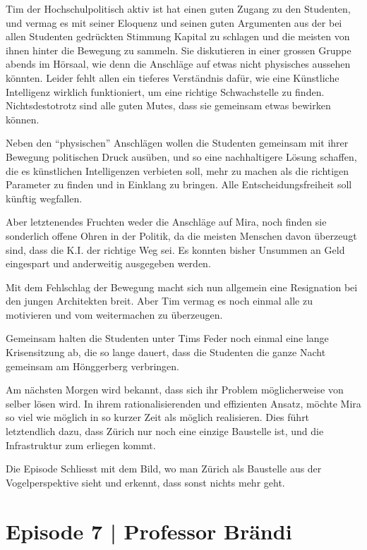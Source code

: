 \documentclass[11pt,a4paper,ngerman]{scrreprt}
\begin{document}
Tim der Hochschulpolitisch aktiv ist hat einen guten Zugang zu den Studenten,
und vermag es mit seiner Eloquenz und seinen guten Argumenten aus der bei allen
Studenten gedrückten Stimmung Kapital zu schlagen und die meisten von ihnen
hinter die Bewegung zu sammeln. Sie diskutieren in einer grossen Gruppe abends
im Hörsaal, wie denn die Anschläge auf etwas nicht physisches aussehen
könnten. Leider fehlt allen ein tieferes Verständnis dafür, wie eine Künstliche
Intelligenz wirklich funktioniert, um eine richtige Schwachstelle zu
finden. Nichtsdestotrotz sind alle guten Mutes, dass sie gemeinsam etwas
bewirken können.

Neben den ``physischen'' Anschlägen wollen die Studenten gemeinsam mit ihrer
Bewegung politischen Druck ausüben, und so eine nachhaltigere Lösung schaffen,
die es künstlichen Intelligenzen verbieten soll, mehr zu machen als die
richtigen Parameter zu finden und in Einklang zu bringen. Alle
Entscheidungsfreiheit soll künftig wegfallen.

Aber letztenendes Fruchten weder die Anschläge auf Mira, noch finden sie
sonderlich offene Ohren in der Politik, da die meisten Menschen davon überzeugt
sind, dass die K.I. der richtige Weg sei. Es konnten bisher Unsummen an Geld
eingespart und anderweitig ausgegeben werden.

Mit dem Fehlschlag der Bewegung macht sich nun allgemein eine Resignation bei
den jungen Architekten breit. Aber Tim vermag es noch einmal alle zu motivieren
und vom weitermachen zu überzeugen.

Gemeinsam halten die Studenten unter Tims Feder noch einmal eine lange
Krisensitzung ab, die so lange dauert, dass die Studenten die ganze Nacht
gemeinsam am Hönggerberg verbringen.

Am nächsten Morgen wird bekannt, dass sich ihr Problem möglicherweise von selber
lösen wird. In ihrem rationalisierenden und effizienten Ansatz, möchte Mira so
viel wie möglich in so kurzer Zeit als möglich realisieren. Dies führt
letztendlich dazu, dass Zürich nur noch eine einzige Baustelle ist, und die
Infrastruktur zum erliegen kommt.

Die Episode Schliesst mit dem Bild, wo man Zürich als Baustelle aus der
Vogelperspektive sieht und erkennt, dass sonst nichts mehr geht.

\section*{Episode 7 | Professor Brändi}
\end{document}
